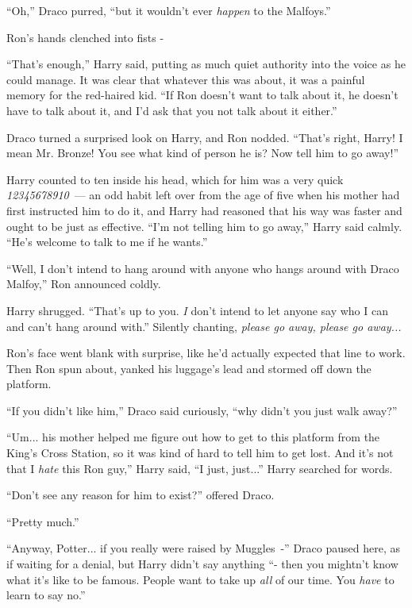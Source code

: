 ``Oh,'' Draco purred, ``but it wouldn't ever \emph{happen} to the Malfoys.''

Ron's hands clenched into fists -

``That's enough,'' Harry said, putting as much quiet authority into the voice as he could manage. It was clear that whatever this was about, it was a painful memory for the red-haired kid. ``If Ron doesn't want to talk about it, he doesn't have to talk about it, and I'd ask that you not talk about it either.''

Draco turned a surprised look on Harry, and Ron nodded. ``That's right, Harry! I mean Mr. Bronze! You see what kind of person he is? Now tell him to go away!''

Harry counted to ten inside his head, which for him was a very quick \emph{12345678910}~--- an odd habit left over from the age of five when his mother had first instructed him to do it, and Harry had reasoned that his way was faster and ought to be just as effective. ``I'm not telling him to go away,'' Harry said calmly. ``He's welcome to talk to me if he wants.''

``Well, I don't intend to hang around with anyone who hangs around with Draco Malfoy,'' Ron announced coldly.

Harry shrugged. ``That's up to you. \emph{I} don't intend to let anyone say who I can and can't hang around with.'' Silently chanting, \emph{please go away, please go away...}

Ron's face went blank with surprise, like he'd actually expected that line to work. Then Ron spun about, yanked his luggage's lead and stormed off down the platform.

``If you didn't like him,'' Draco said curiously, ``why didn't you just walk away?''

``Um... his mother helped me figure out how to get to this platform from the King's Cross Station, so it was kind of hard to tell him to get lost. And it's not that I \emph{hate} this Ron guy,'' Harry said, ``I just, just...'' Harry searched for words.

``Don't see any reason for him to exist?'' offered Draco.

``Pretty much.''

``Anyway, Potter... if you really were raised by Muggles~-'' Draco paused here, as if waiting for a denial, but Harry didn't say anything ``- then you mightn't know what it's like to be famous. People want to take up \emph{all} of our time. You \emph{have} to learn to say no.''


